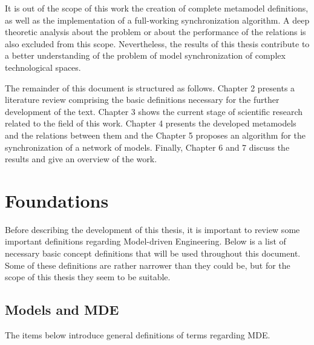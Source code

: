 \documentclass[tuberlin,cic,tc,english,noabntcite,oneside]{iiufrgs}
\begin{document}
It is out of the scope of this work the creation of complete metamodel definitions, as well as the implementation of a full-working synchronization algorithm. A deep theoretic analysis about the problem or about the performance of the relations is also excluded from this scope. Nevertheless, the results of this thesis contribute to a better understanding of the problem of model synchronization of complex technological spaces.

The remainder of this document is structured as follows. Chapter 2 presents a literature review comprising the basic definitions necessary for the further development of the text. Chapter 3 shows the current stage of scientific research related to the field of this work. Chapter 4 presents the developed metamodels and the relations between them and the Chapter 5 proposes an algorithm for the synchronization of a network of models. Finally, Chapter 6 and 7 discuss the results and give an overview of the work.

\chapter{Foundations}
\label{ch:foundations}
Before describing the development of this thesis, it is important to review some important definitions regarding Model-driven Engineering. Below is a list of necessary basic concept definitions that will be used throughout this document. Some of these definitions are rather narrower than they could be, but for the scope of this thesis they seem to be suitable.

\section{Models and MDE}
The items below introduce general definitions of terms regarding MDE.
\end{document}
